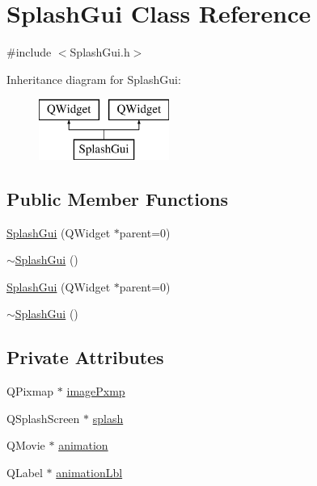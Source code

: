 \hypertarget{class_splash_gui}{\section{Splash\-Gui Class Reference}
\label{class_splash_gui}
}


{\ttfamily \#include $<$Splash\-Gui.\-h$>$}

Inheritance diagram for Splash\-Gui\-:\begin{figure}[H]
\begin{center}
\leavevmode
\includegraphics[height=2.000000cm]{class_splash_gui}
\end{center}
\end{figure}
\subsection*{Public Member Functions}
\begin{DoxyCompactItemize}
\item 
\hyperlink{class_splash_gui_a9c802c06428dd6833431eac142296676}{Splash\-Gui} (Q\-Widget $\ast$parent=0)
\item 
\hyperlink{class_splash_gui_ada2c0fe737f29cf9365e272ac093ec8f}{$\sim$\-Splash\-Gui} ()
\item 
\hyperlink{class_splash_gui_a9c802c06428dd6833431eac142296676}{Splash\-Gui} (Q\-Widget $\ast$parent=0)
\item 
\hyperlink{class_splash_gui_ada2c0fe737f29cf9365e272ac093ec8f}{$\sim$\-Splash\-Gui} ()
\end{DoxyCompactItemize}
\subsection*{Private Attributes}
\begin{DoxyCompactItemize}
\item 
Q\-Pixmap $\ast$ \hyperlink{class_splash_gui_a157210e72a9a561b498a117e5af759f0}{image\-Pxmp}
\item 
Q\-Splash\-Screen $\ast$ \hyperlink{class_splash_gui_a268004470ba048e2791209565c619ee1}{splash}
\item 
Q\-Movie $\ast$ \hyperlink{class_splash_gui_ad8bbc537e3113940d55d07c344166f20}{animation}
\item 
Q\-Label $\ast$ \hyperlink{class_splash_gui_aed3b35b60e42d5cd54c2db2f3ec805ab}{animation\-Lbl}
\end{DoxyCompactItemize}


